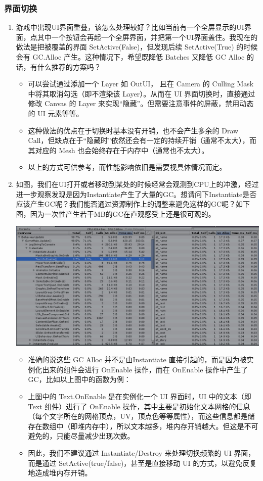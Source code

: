 \documentclass[9pt, b5paper]{article}
\begin{document}
\subsubsection{界面切换}
\label{sec:orgbc84a24}
\begin{enumerate}
\item 游戏中出现UI界面重叠，该怎么处理较好？比如当前有一个全屏显示的UI界面，点其中一个按钮会再起一个全屏界面，并把第一个UI界面盖住。我现在的做法是把被覆盖的界面 SetActive(False)，但发现后续 SetActive(True) 的时候会有 GC.Alloc 产生。这种情况下，希望既降低 Batches 又降低 GC Alloc 的话，有什么推荐的方案吗？
\label{sec:org54c16ee}
\begin{itemize}
\item 可以尝试通过添加一个 Layer 如 OutUI， 且在 Camera 的 Culling Mask 中将其取消勾选（即不渲染该 Layer）。从而在 UI 界面切换时，直接通过修改 Canvas 的 Layer 来实现“隐藏”。但需要注意事件的屏蔽，禁用动态的 UI 元素等等。
\item 这种做法的优点在于切换时基本没有开销，也不会产生多余的 Draw Call，但缺点在于“隐藏时”依然还会有一定的持续开销（通常不太大），而其对应的 Mesh 也会始终存在于内存中（通常也不太大）。
\item 以上的方式可供参考，而性能影响依旧是需要视具体情况而定。
\end{itemize}
\item 如图，我们在UI打开或者移动到某处的时候经常会观测到CPU上的冲激，经过进一步观察发现是因为Instantiate产生了大量的GC。想请问下Instantiate是否应该产生GC呢？我们能否通过资源制作上的调整来避免这样的GC呢？如下图，因为一次性产生若干MB的GC在直观感受上还是很可观的。
\label{sec:org20172f1}

\begin{center}
\includegraphics[width=.9\linewidth]{./pic/ugui3.jpg}
\end{center}
\begin{itemize}
\item 准确的说这些 GC Alloc 并不是由Instantiate 直接引起的，而是因为被实例化出来的组件会进行 OnEnable 操作，而在 OnEnable 操作中产生了 GC，比如以上图中的函数为例：
\item 上图中的 Text.OnEnable 是在实例化一个 UI 界面时，UI 中的文本（即 Text 组件）进行了 OnEnable 操作，其中主要是初始化文本网格的信息（每个文字所在的网格顶点，UV，顶点色等等属性），而这些信息都是储存在数组中（即堆内存中），所以文本越多，堆内存开销越大。但这是不可避免的，只能尽量减少出现次数。
\item 因此，我们不建议通过 Instantiate/Destroy 来处理切换频繁的 UI 界面，而是通过 SetActive(true/false)，甚至是直接移动 UI 的方式，以避免反复地造成堆内存开销。
\end{itemize}
\end{enumerate}
\end{document}
